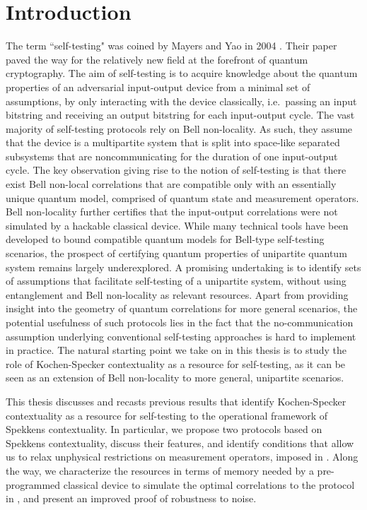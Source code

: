 \chapter{Introduction}
The term ``self-testing" was coined by Mayers and Yao in 2004 \cite{Mayers2003}. Their paper paved the way for the relatively new field at the forefront of quantum cryptography. The aim of self-testing is to acquire knowledge about the quantum properties of an adversarial input-output device from a minimal set of assumptions, by only interacting with the device classically, i.e.\ passing an input bitstring and receiving an output bitstring for each input-output cycle. The vast majority of self-testing protocols rely on Bell non-locality. As such, they assume that the device is a multipartite system that is split into space-like separated subsystems that are noncommunicating for the duration of one input-output cycle. The key observation giving rise to the notion of self-testing is that there exist Bell non-local correlations that are compatible only with an essentially unique quantum model, comprised of quantum state and measurement operators. Bell non-locality further certifies that the input-output correlations were not simulated by a hackable classical device. While
many technical tools have been developed to bound compatible quantum models for Bell-type self-testing scenarios, the prospect of certifying quantum properties of unipartite quantum system remains largely underexplored. A promising undertaking is to identify sets of assumptions that facilitate self-testing of a unipartite system, without using entanglement and Bell non-locality as relevant resources. Apart from providing insight into the geometry of quantum correlations for more general scenarios, the potential usefulness of such protocols lies in the fact that the no-communication assumption underlying conventional self-testing approaches is hard to implement in practice. The natural starting point we take on in this thesis is to study the role of Kochen-Specker contextuality as a resource for self-testing, as it can be seen as an extension of Bell non-locality to more general, unipartite scenarios. 

This thesis discusses and recasts previous results \cite{Bharti2019} that identify Kochen-Specker contextuality as a resource for self-testing to the operational framework of Spekkens contextuality. In particular, we propose two protocols based on Spekkens contextuality, discuss their features, and identify conditions that allow us to relax unphysical restrictions on measurement operators, imposed in \cite{Bharti2019}. Along the way, we characterize the resources in terms of memory needed by a pre-programmed classical device to simulate the optimal correlations to the protocol in \cite{Bharti2019}, and present an improved proof of robustness to noise.

